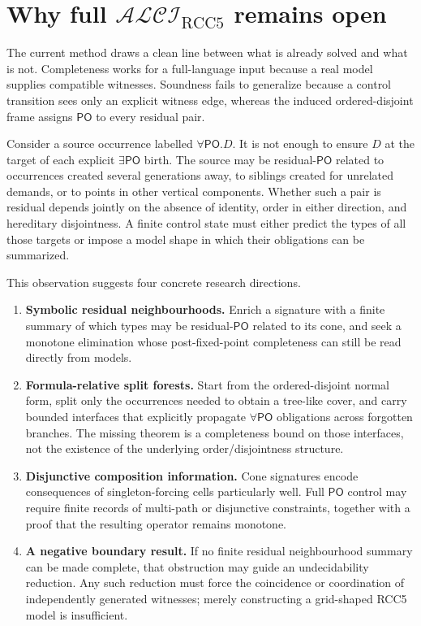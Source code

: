\documentclass[11pt]{article}
\theoremstyle{plain}
\theoremstyle{definition}
\theoremstyle{remark}
\newcommand{\Logic}{\ensuremath{\mathcal{ALCI}_{\mathrm{RCC5}}}}
\newcommand{\PO}{\ensuremath{\mathsf{PO}}}
\begin{document}
\section{\texorpdfstring{Why full $\Logic$ remains open}{Why full ALCI-RCC5 remains open}}
\label{sec:full}

The current method draws a clean line between what is already solved and what
is not.  Completeness works for a full-language input because a real model
supplies compatible witnesses.  Soundness fails to generalize because a
control transition sees only an explicit witness edge, whereas the induced
ordered-disjoint frame assigns $\PO$ to every residual pair.

Consider a source occurrence labelled $\forall\PO.D$.  It is not enough to
ensure $D$ at the target of each explicit $\exists\PO$ birth.  The source may
be residual-$\PO$ related to occurrences created several generations away,
to siblings created for unrelated demands, or to points in other vertical
components.  Whether such a pair is residual depends jointly on the absence of
identity, order in either direction, and hereditary disjointness.  A finite
control state must either predict the types of all those targets or impose a
model shape in which their obligations can be summarized.

This observation suggests four concrete research directions.

\begin{enumerate}
  \item \textbf{Symbolic residual neighbourhoods.}  Enrich a signature with a
  finite summary of which types may be residual-$\PO$ related to its cone, and
  seek a monotone elimination whose post-fixed-point completeness can still be
  read directly from models.

  \item \textbf{Formula-relative split forests.}  Start from the
  ordered-disjoint normal form, split only the occurrences needed to obtain a
  tree-like cover, and carry bounded interfaces that explicitly propagate
  $\forall\PO$ obligations across forgotten branches.  The missing theorem is
  a completeness bound on those interfaces, not the existence of the
  underlying order/disjointness structure.

  \item \textbf{Disjunctive composition information.}  Cone signatures encode
  consequences of singleton-forcing cells particularly well.  Full $\PO$
  control may require finite records of multi-path or disjunctive constraints,
  together with a proof that the resulting operator remains monotone.

  \item \textbf{A negative boundary result.}  If no finite residual
  neighbourhood summary can be made complete, that obstruction may guide an
  undecidability reduction.  Any such reduction must force the coincidence or
  coordination of independently generated witnesses; merely constructing a
  grid-shaped RCC5 model is insufficient.
\end{enumerate}
\end{document}
